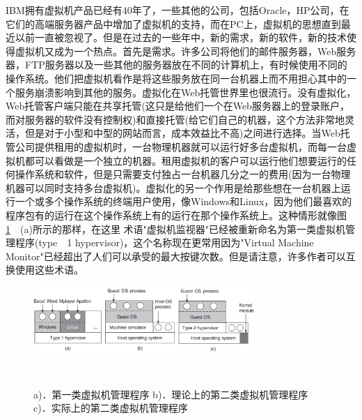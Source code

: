 	IBM拥有虚拟机产品已经有40年了，一些其他的公司，包括Oracle，HP公司，在它们的高端服务器产品中增加了虚拟机的支持，而在PC上，虚拟机的思想直到最近以前一直被忽视了。但是在过去的一些年中，新的需求，新的软件，新的技术使得虚拟机又成为一个热点。首先是需求。许多公司将他们的邮件服务器，Web服务器，FTP服务器以及一些其他的服务器放在不同的计算机上，有时候使用不同的操作系统。他们把虚拟机看作是将这些服务放在同一台机器上而不用担心其中的一个服务崩溃影响到其他的服务。虚拟化在Web托管世界里也很流行。没有虚拟化，Web托管客户端只能在共享托管(这只是给他们一个在Web服务器上的登录账户，而对服务器的软件没有控制权)和直接托管(给它们自己的机器，这个方法非常地灵活，但是对于小型和中型的网站而言，成本效益比不高)之间进行选择。当Web托管公司提供租用的虚拟机时，一台物理机器就可以运行好多台虚拟机，而每一台虚拟机都可以看做是一个独立的机器。租用虚拟机的客户可以运行他们想要运行的任何操作系统和软件，但是只需要支付独占一台机器几分之一的费用(因为一台物理机器可以同时支持多台虚拟机)。虚拟化的另一个作用是给那些想在一台机器上运行一个或多个操作系统的终端用户使用，像Windows和Linux，因为他们最喜欢的程序包有的运行在这个操作系统上有的运行在那个操作系统上。这种情形就像图　\ref{fig:hypervisor}　(a)所示的那样，在这里
	术语"虚拟机监视器"已经被重新命名为第一类虚拟机管理程序(type　1 hypervisor)，这个名称现在更常用因为"Virtual  Machine Monitor"已经超出了人们可以承受的最大按键次数。但是请注意，许多作者可以互换使用这些术语。
	
    \begin{figure}[ht]\small
		\centering
		\includegraphics[width=0.75\textwidth]{FIG/1-29.png}
		\caption{a)．第一类虚拟机管理程序 b)．理论上的第二类虚拟机管理程序 c)．实际上的第二类虚拟机管理程序}　\label{fig:hypervisor}
	\end{figure}
	
